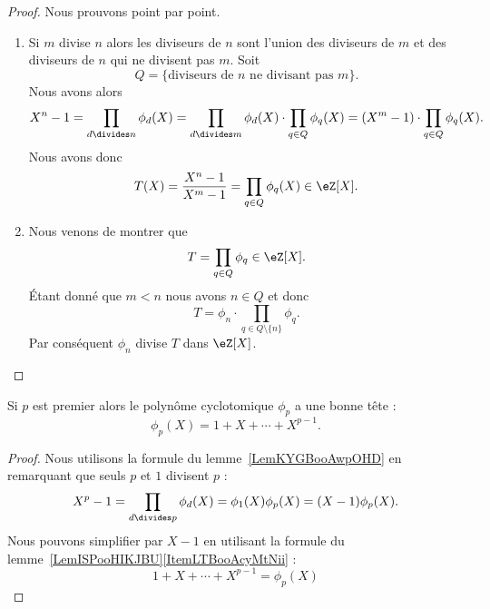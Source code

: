\begin{proof}
    Nous prouvons point par point.
    \begin{enumerate}
        \item
            Si \( m\) divise \( n\) alors les diviseurs de \( n\) sont l'union des diviseurs de \( m\) et des diviseurs de \( n\) qui ne divisent pas \( m\). Soit
            \begin{equation}
                Q=\{\text{diviseurs de } n\text{ ne divisant pas } m \}.
            \end{equation}
            Nous avons alors
            \begin{equation}
                X^n-1=\prod_{d\divides n}\phi_d(X)=\prod_{d\divides m}\phi_d(X)\cdot\prod_{q\in Q}\phi_q(X)=(X^m-1)\cdot\prod_{q\in Q}\phi_q(X).
            \end{equation}
            Nous avons donc
            \begin{equation}
                T(X)=\frac{ X^n-1 }{ X^m-1 }=\prod_{q\in Q}\phi_q(X)\in \eZ[X].
            \end{equation}

        \item

            Nous venons de montrer que
            \begin{equation}
                T=\prod_{q\in Q}\phi_q\in \eZ[X].
            \end{equation}
            Étant donné que \( m<n\) nous avons \( n\in Q\) et donc
            \begin{equation}
                T=\phi_n\cdot\prod_{q\in Q\setminus\{ n \}}\phi_q.
            \end{equation}
            Par conséquent \( \phi_n\) divise \( T\) dans \( \eZ[X]\).
        \end{enumerate}
\end{proof}

\begin{corollary}   \label{CorTVUooErJiAC}
    Si \( p\) est premier alors le polynôme cyclotomique \( \phi_p\) a une bonne tête :
    \begin{equation}
        \phi_p(X)=1+X+\cdots +X^{p-1}.
    \end{equation}
\end{corollary}

\begin{proof}
    Nous utilisons la formule du lemme~\ref{LemKYGBooAwpOHD} en remarquant que seuls \( p\) et \( 1\) divisent \( p\) :
    \begin{equation}
        X^p-1=\prod_{d\divides p}\phi_d(X)=\phi_1(X)\phi_p(X)=(X-1)\phi_p(X).
    \end{equation}
    Nous pouvons simplifier par \( X-1\) en utilisant la formule du lemme~\ref{LemISPooHIKJBU}\ref{ItemLTBooAcyMtNii} :
    \begin{equation}
        1+X+\cdots +X^{p-1}=\phi_p(X)
    \end{equation}
\end{proof}

